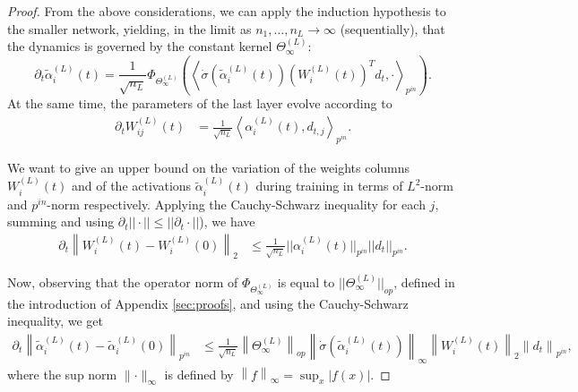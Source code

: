 \documentclass{article}
\begin{document}
\begin{proof}
From the above considerations, we can apply the induction hypothesis to the smaller network, yielding, in the limit as $n_1, \ldots, n_L \to \infty$ (sequentially), that the dynamics is governed by the constant kernel $ \Theta^{(L)}_\infty $:
\[
    \partial_t \tilde{\alpha}^{(L)}_{i}(t) =  \frac{1}{\sqrt{n_L}} \Phi_{\Theta^{(L)}_\infty} \left( \left< \dot{\sigma}\left(\tilde{\alpha}^{(L)}_i(t)\right) \left(W^{(L)}_i(t)\right)^T d_t, \cdot \right>_{p^{in}} \right) .
\] 
At the same time, the parameters of the last layer evolve according to
\begin{align*}
 \partial_t W^{(L)}_{ij}(t) &= \frac{1}{\sqrt{n_L}} \left< \alpha^{(L)}_i(t),  d_{t, j} \right>_{p^{in}}.
\end{align*}


We want to give an upper bound on the variation of the weights columns $W_i^{(L)}(t)$ and of the activations $\tilde{\alpha}^{(L)}_{i}(t)$ during training in terms of $L^2$-norm and $p^{in}$-norm respectively. Applying the Cauchy-Schwarz inequality for each $ j $, summing and using $ \partial_t || \cdot || \leq || \partial_t \cdot || $), we have
\begin{align*}
    \partial_t \left\lVert W^{(L)}_{i}(t) - W^{(L)}_{i}(0) \right\rVert_2 &\leq \frac{1}{\sqrt{n_L}} ||\alpha^{(L)}_i(t)||_{p^{in}} ||d_t||_{p^{in}}. 
\end{align*}

Now, observing that the operator norm of $\Phi_{\Theta_\infty^{(L)}}$ is equal to $\vert \vert \Theta_\infty^{(L)}\vert \vert_{op}$, defined in the introduction of Appendix \ref{sec:proofs}, and using the Cauchy-Schwarz inequality, we get
\begin{align*}
    \partial_t \left\lVert \tilde{\alpha}^{(L)}_{i}(t) - \tilde{\alpha}^{(L)}_{i}(0) \right\rVert_{p^{in}} &\leq \frac{1}{\sqrt{n_L}} \left\lVert \Theta^{(L)}_\infty \right\rVert_{op} \left\lVert \dot{\sigma}\left(\tilde{\alpha}^{(L)}_i(t)\right) \right\rVert_\infty \left\lVert W^{(L)}_i(t)\right\rVert_2 \left\lVert d_t \right\rVert_{p^{in}},
\end{align*}
where the sup norm $ \lVert \cdot \rVert_{\infty} $ is defined by $\left\lVert f \right\lVert_\infty = \sup_x | f(x) |.$


\end{proof}
\end{document}
